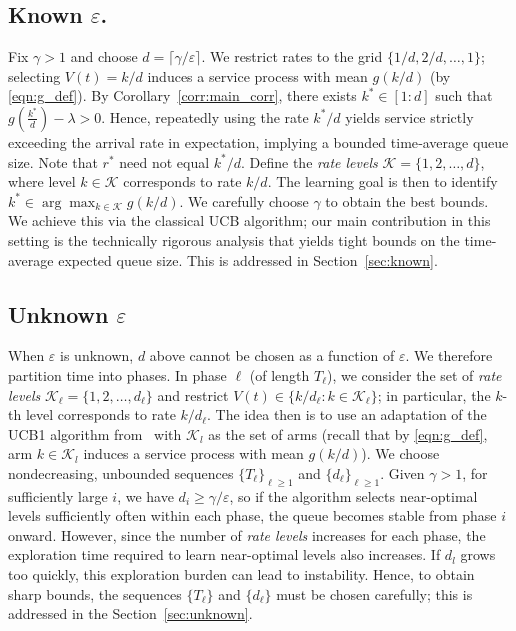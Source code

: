 \documentclass[12pt,draftcls, onecolumn]{IEEEtran}
\begin{document}
\subsection{Known $\varepsilon$.}
Fix \(\gamma>1\) and choose \(d=\lceil \gamma/\varepsilon\rceil\). We restrict rates to the grid \(\{1/d,2/d,\dots,1\}\); selecting \(V(t)=k/d\) induces a service process with mean \(g(k/d)\) (by \eqref{eqn:g_def}). By Corollary~\ref{corr:main_corr}, there exists \(k^*\in[1:d]\) such that $g\!\left(\frac{k^*}{d}\right)-\lambda>0$.
Hence, repeatedly using the rate \(k^*/d\) yields service strictly exceeding the arrival rate in expectation, implying a bounded time‐average queue size. Note that \(r^*\) need not equal \(k^*/d\). Define the \emph{rate levels}  $\mathcal{K}=\{1,2,\dots,d\}$, where level \(k\in\mathcal{K}\) corresponds to rate \(k/d\). The learning goal is then to identify $k^* \in \arg\max_{k\in\mathcal{K}} g(k/d)$. We carefully choose $\gamma$ to obtain the best bounds. We achieve this via the classical UCB algorithm; our main contribution in this setting is the technically rigorous analysis that yields tight bounds on the time-average expected queue size. This is addressed in Section~\ref{sec:known}.

\subsection{Unknown $\varepsilon$}\label{eqn:unknown_para}
When \(\varepsilon\) is unknown, \(d\) above cannot be chosen as a function of \(\varepsilon\). We therefore partition time into phases. In phase \(\ell\) (of length \(T_\ell\)), we consider the set of \emph{rate levels} $\mathcal{K}_\ell=\{1,2,\dots,d_\ell\}$
and restrict \(V(t)\in\{k/d_\ell: k\in\mathcal{K}_\ell\}\); in particular, the \(k\)-th level corresponds to rate \(k/d_\ell\). The idea then is to use an adaptation of the UCB1 algorithm from~\cite{Auer2002FinitetimeAO} with $\mathcal{K}_l$ as the set of arms (recall that by \eqref{eqn:g_def}, arm $k \in \mathcal{K}_l$ induces a service process with mean \(g(k/d)\)). We choose nondecreasing, unbounded sequences \(\{T_\ell\}_{\ell\ge1}\) and \(\{d_\ell\}_{\ell\ge1}\). Given $\gamma > 1$, for sufficiently large \(i\), we have \(d_i\ge \gamma/\varepsilon\), so if the algorithm selects near-optimal levels sufficiently often within each phase, the queue becomes stable from phase \(i\) onward. However, since the number of \emph{rate levels} increases for each phase, the exploration time required to learn near-optimal levels also increases. If $d_l$ grows too quickly, this exploration burden can lead to instability. Hence, to obtain sharp bounds, the sequences \(\{T_\ell\}\) and \(\{d_\ell\}\) must be chosen carefully; this is addressed in the Section~\ref{sec:unknown}. 
\end{document}
